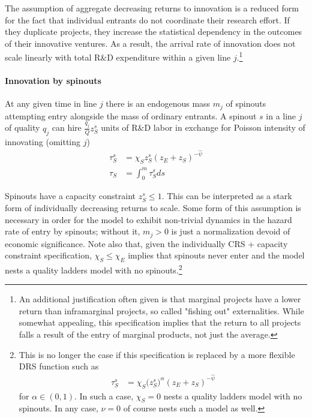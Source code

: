 \documentclass[12pt,english]{article}
\theoremstyle{remark}
\begin{document}
The assumption of aggregate decreasing returns to innovation is a reduced form for the fact that individual entrants do not coordinate their research effort. If they duplicate projects, they increase the statistical dependency in the outcomes of their innovative ventures. As a result, the arrival rate of innovation does not scale linearly with total R\&D expenditure within a given line $j$.\footnote{An additional justification often given is that marginal projects have a lower return than inframarginal projects, so called "fishing out" externalities. While somewhat appealing, this specification implies that the return to all projects falls a result of the entry of marginal products, not just the average.}

\paragraph{Innovation by spinouts}

At any given time in line $j$ there is an endogenous mass $m_j$ of spinouts attempting entry alongside the mass of ordinary entrants. A spinout $s$ in a line $j$ of quality $q_j$ can hire $ \frac{q_j}{Q} z_S^s$ units of R\&D labor in exchange for Poisson intensity of innovating (omitting $j$)
\begin{align}
\tau_S^s &= \chi_S z_S^s (z_E+ z_S)^{-\hat{\psi}}\label{spinout_entry_rate_eq} \\
\tau_S &= \int_0^m \tau_S^s ds \nonumber
\end{align}

Spinouts have a capacity constraint $z_S^s \le 1$. This can be interpreted as a stark form of individually decreasing returns to scale. Some form of this assumption is necessary in order for the model to exhibit non-trivial dynamics in the hazard rate of entry by spinouts; without it, $m_j > 0$ is just a normalization devoid of economic significance. Note also that, given the individually CRS + capacity constraint specification, $\chi_S \le \chi_E$ implies that spinouts never enter and the model nests a quality ladders model with no spinouts.\footnote{This is no longer the case if this specification is replaced by a more flexible DRS function such as 
	\begin{align}
	\tau_S^s &= \chi_S \Big(z_S^s\Big)^{\alpha} (z_E+ z_S)^{-\hat{\psi}} \nonumber
	\end{align}
	for $\alpha \in (0,1)$. In such a case, $\chi_S = 0$ nests a quality ladders model with no spinouts. In any case, $\nu = 0$ of course nests such a model as well.}
\end{document}
